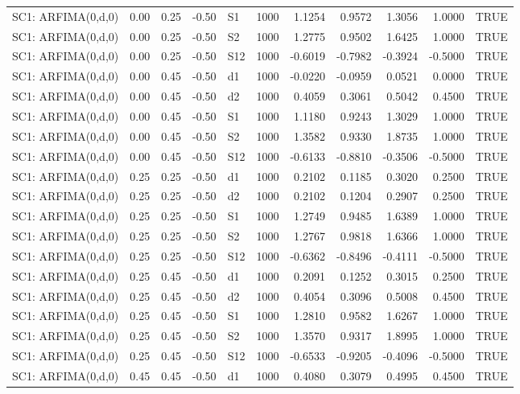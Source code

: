 \begin{table}[ht]
\begin{tabular}{lrrrlrrrrrl}
  SC1: ARFIMA(0,d,0) & 0.00 & 0.25 & -0.50 & S1 & 1000 & 1.1254 & 0.9572 & 1.3056 & 1.0000 & TRUE \\ 
  SC1: ARFIMA(0,d,0) & 0.00 & 0.25 & -0.50 & S2 & 1000 & 1.2775 & 0.9502 & 1.6425 & 1.0000 & TRUE \\ 
  SC1: ARFIMA(0,d,0) & 0.00 & 0.25 & -0.50 & S12 & 1000 & -0.6019 & -0.7982 & -0.3924 & -0.5000 & TRUE \\ 
  SC1: ARFIMA(0,d,0) & 0.00 & 0.45 & -0.50 & d1 & 1000 & -0.0220 & -0.0959 & 0.0521 & 0.0000 & TRUE \\ 
  SC1: ARFIMA(0,d,0) & 0.00 & 0.45 & -0.50 & d2 & 1000 & 0.4059 & 0.3061 & 0.5042 & 0.4500 & TRUE \\ 
  SC1: ARFIMA(0,d,0) & 0.00 & 0.45 & -0.50 & S1 & 1000 & 1.1180 & 0.9243 & 1.3029 & 1.0000 & TRUE \\ 
  SC1: ARFIMA(0,d,0) & 0.00 & 0.45 & -0.50 & S2 & 1000 & 1.3582 & 0.9330 & 1.8735 & 1.0000 & TRUE \\ 
  SC1: ARFIMA(0,d,0) & 0.00 & 0.45 & -0.50 & S12 & 1000 & -0.6133 & -0.8810 & -0.3506 & -0.5000 & TRUE \\ 
  SC1: ARFIMA(0,d,0) & 0.25 & 0.25 & -0.50 & d1 & 1000 & 0.2102 & 0.1185 & 0.3020 & 0.2500 & TRUE \\ 
  SC1: ARFIMA(0,d,0) & 0.25 & 0.25 & -0.50 & d2 & 1000 & 0.2102 & 0.1204 & 0.2907 & 0.2500 & TRUE \\ 
  SC1: ARFIMA(0,d,0) & 0.25 & 0.25 & -0.50 & S1 & 1000 & 1.2749 & 0.9485 & 1.6389 & 1.0000 & TRUE \\ 
  SC1: ARFIMA(0,d,0) & 0.25 & 0.25 & -0.50 & S2 & 1000 & 1.2767 & 0.9818 & 1.6366 & 1.0000 & TRUE \\ 
  SC1: ARFIMA(0,d,0) & 0.25 & 0.25 & -0.50 & S12 & 1000 & -0.6362 & -0.8496 & -0.4111 & -0.5000 & TRUE \\ 
  SC1: ARFIMA(0,d,0) & 0.25 & 0.45 & -0.50 & d1 & 1000 & 0.2091 & 0.1252 & 0.3015 & 0.2500 & TRUE \\ 
  SC1: ARFIMA(0,d,0) & 0.25 & 0.45 & -0.50 & d2 & 1000 & 0.4054 & 0.3096 & 0.5008 & 0.4500 & TRUE \\ 
  SC1: ARFIMA(0,d,0) & 0.25 & 0.45 & -0.50 & S1 & 1000 & 1.2810 & 0.9582 & 1.6267 & 1.0000 & TRUE \\ 
  SC1: ARFIMA(0,d,0) & 0.25 & 0.45 & -0.50 & S2 & 1000 & 1.3570 & 0.9317 & 1.8995 & 1.0000 & TRUE \\ 
  SC1: ARFIMA(0,d,0) & 0.25 & 0.45 & -0.50 & S12 & 1000 & -0.6533 & -0.9205 & -0.4096 & -0.5000 & TRUE \\ 
  SC1: ARFIMA(0,d,0) & 0.45 & 0.45 & -0.50 & d1 & 1000 & 0.4080 & 0.3079 & 0.4995 & 0.4500 & TRUE \\ 

\end{tabular}
\end{table}
